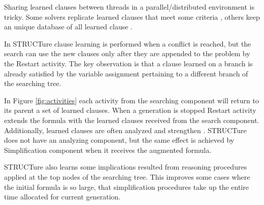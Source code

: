 Sharing learned clauses between threads in a parallel/distributed
environment is tricky.  Some solvers replicate learned clauses that
meet some criteria \cite{Hamadi09manysat:a}, others keep an unique
database of all learned clause \cite{mine:miraxt}.

In STRUCTure clause learning is performed when a conflict is reached,
but the search can use the new clauses only after they are appended
to the problem by the Restart activity.  The key observation is that
a clause learned on a branch is already satisfied by the variable
assignment pertaining to a different branch of the searching tree.

In Figure \ref{fig:activities} each activity from the searching
component will return to its parent a set of learned clauses. When
a generation is stopped Restart activity extends the formula
with the learned clauses received from the search component.
Additionally, learned clauses are often analyzed and strengthen
\cite{Audemard_ageneralized}. STRUCTure does not have an analyzing
component, but the same effect is achieved by Simplification
component when it receives the augmented formula.

STRUCTure also learns some implications resulted from reasoning
procedures applied at the top nodes of the searching tree. This
improves some cases where the initial formula is so large, that
simplification procedures take up the entire time allocated for
current generation.
